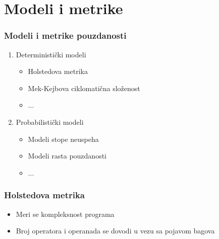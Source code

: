 \documentclass{beamer}
\begin{document}
\section{Modeli i metrike}
\begin{frame}
\frametitle{Modeli i metrike pouzdanosti}

\begin{enumerate}
\item Deterministički modeli
\begin{itemize}
\item Holstedova metrika
\item Mek-Kejbova ciklomatična složenost
\item ...
\end{itemize}
\item Probabilistički modeli
\begin{itemize}
\item Modeli stope neuspeha
\item Modeli rasta pouzdanosti
\item ...
\end{itemize}
\end{enumerate}

\end{frame}


\begin{frame}
\frametitle{Holstedova metrika}

\begin{itemize}
\item Meri se kompleksnost programa
\item Broj operatora i operanada se dovodi u vezu sa pojavom bagova
\end{itemize}

\end{frame}
\end{document}
